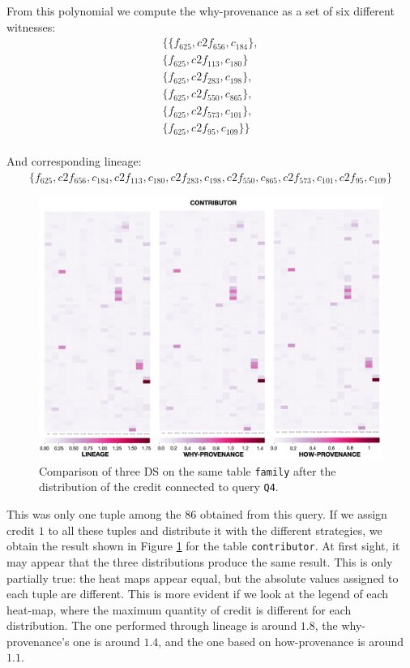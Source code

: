 From this polynomial we compute the why-provenance as a set of six different witnesses:
\[
\begin{array}{c}
\{\{ f_{625}, c2f_{656}, c_{184} \}, \\ \{ f_{625}, c2f_{113}, c_{180} \} \\
\{ f_{625}, c2f_{283}, c_{198} \}, \\ \{ f_{625}, c2f_{550}, c_{865} \},\\
 \{ f_{625}, c2f_{573}, c_{101}\} , \\ \{f_{625}, c2f_{95}, c_{109} \}\}	\\
\end{array}
\]

And corresponding lineage:
\[
\begin{array}{c}
	\{ f_{625}, c2f_{656}, c_{184}, c2f_{113}, c_{180}, 
  c2f_{283}, c_{198}, c2f_{550}, c_{865}, 
  c2f_{573}, c_{101}, c2f_{95}, c_{109}\}
\end{array}
\]

\begin{figure}[tb]
  \includegraphics[width=1\textwidth]{figures/synthetic_queries}
  \caption{Comparison of three DS on the same table \texttt{family} after the distribution of the credit connected to query \texttt{Q4}.}
  \label{figure:comparison_on_synthetic_query_1}
\end{figure}

This was only one tuple among the $86$ obtained from this query. If we assign credit $1$ to all these tuples and distribute it with the different strategies, we obtain the result shown in Figure \ref{figure:comparison_on_synthetic_query_1} for the table \texttt{contributor}.
At first sight, it may appear that the three distributions produce the same result. This is only partially true: the heat maps appear equal, but the absolute values assigned to each tuple are different. 
This is more evident if we look at the legend of each heat-map, where the maximum quantity of credit is different for each distribution. The one performed through lineage is around $1.8$, the why-provenance's one is around $1.4$, and the one based on how-provenance is around $1.1$. 

